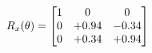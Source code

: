 \documentclass[preview]{standalone}
\begin{document}
\begin{align*}
\special{dvisvgm:raw <g id='unique000'>}R_{x}(\theta) = \begin{bmatrix}1 & 0 & 0 \\0 & +0.94 & -0.34 \\0 & +0.34 & +0.94\end{bmatrix}\special{dvisvgm:raw </g>}
\end{align*}
\end{document}
